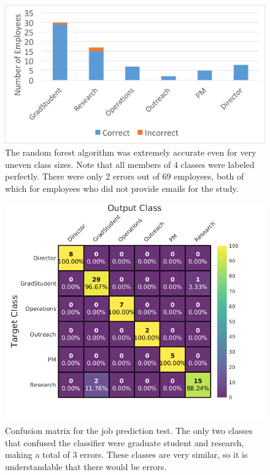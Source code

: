 \documentclass[12pt]{report}
\begin{document}
\begin{figure}[t]
    \centering
    \includegraphics[width=\columnwidth,trim={0mm 0mm 0mm 0mm},clip]{Prediction_50_50_RF}
    \vspace{-20pt}
    \caption[Job title classification results]{The random forest algorithm was extremely accurate even for very uneven class sizes.  Note that all members of 4 classes were labeled perfectly.  There were only 2 errors out of 69 employees, both of which for employees who did not provide emails for the study.}
    \label{fig:result_hist}
\end{figure}


\begin{figure}[t]
    \centering
        \includegraphics[width=.7\columnwidth,trim={0mm 0mm 0mm 0mm},clip]{Classification_confusion}
        \vspace{-7pt}
        \caption[Job title prediction confusion matrix]{Confusion matrix for the job prediction test.  The only two classes that confused the classifier were graduate student and research, making a total of 3 errors.  These classes are very similar, so it is understandable that there would be errors.}
        \label{fig:conf_matrix}
\end{figure}
\end{document}
